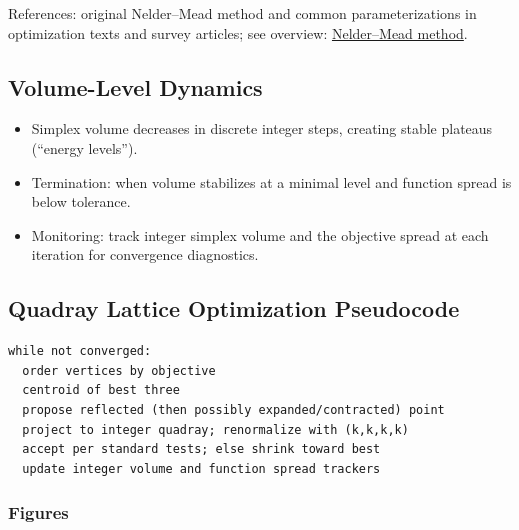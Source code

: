 \documentclass[
  10pt,
]{article}
\providecommand{\tightlist}{%
  \setlength{\itemsep}{0pt}\setlength{\parskip}{0pt}}
\begin{document}
References: original Nelder--Mead method and common parameterizations in
optimization texts and survey articles; see overview:
\href{https://en.wikipedia.org/wiki/Nelder\%E2\%80\%93Mead_method}{Nelder--Mead
method}.

\hypertarget{volume-level-dynamics}{%
\subsection{Volume-Level Dynamics}\label{volume-level-dynamics}}

\begin{itemize}
\tightlist
\item
  Simplex volume decreases in discrete integer steps, creating stable
  plateaus (``energy levels'').
\item
  Termination: when volume stabilizes at a minimal level and function
  spread is below tolerance.
\item
  Monitoring: track integer simplex volume and the objective spread at
  each iteration for convergence diagnostics.
\end{itemize}

\hypertarget{code:nelder_mead_on_integer_lattice}{%
\subsection{Quadray Lattice Optimization
Pseudocode}\label{code:nelder_mead_on_integer_lattice}}

\begin{lstlisting}
while not converged:
  order vertices by objective
  centroid of best three
  propose reflected (then possibly expanded/contracted) point
  project to integer quadray; renormalize with (k,k,k,k)
  accept per standard tests; else shrink toward best
  update integer volume and function spread trackers
\end{lstlisting}

\hypertarget{figures-1}{%
\subsubsection{Figures}\label{figures-1}}
\end{document}
